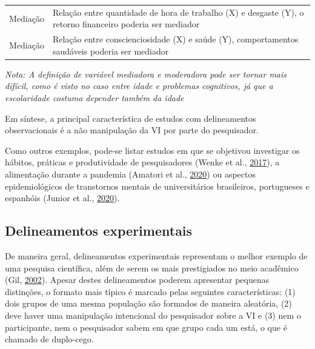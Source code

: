 \documentclass[
]{book}
\begin{document}
\begin{longtable}[]{@{}ll@{}}
\begin{minipage}[t]{0.10\columnwidth}\raggedright
Mediação\strut
\end{minipage} & \begin{minipage}[t]{0.84\columnwidth}\raggedright
Relação entre quantidade de hora de trabalho (X) e desgaste (Y), o
retorno financeiro poderia ser mediador\strut
\end{minipage}\tabularnewline
\begin{minipage}[t]{0.10\columnwidth}\raggedright
Mediação\strut
\end{minipage} & \begin{minipage}[t]{0.84\columnwidth}\raggedright
Relação entre conscienciosidade (X) e saúde (Y), comportamentos
saudáveis poderia ser mediador\strut
\end{minipage}\tabularnewline
\bottomrule
\end{longtable}

\emph{Nota: A definição de variável mediadora e moderadora pode ser
tornar mais difícil, como é visto no caso entre idade e problemas
cognitivos, já que a escolaridade costuma depender também da idade}

Em síntese, a principal característica de estudos com delineamentos
observacionais é a não manipulação da VI por parte do pesquisador.

Como outros exemplos, pode-se listar estudos em que se objetivou
investigar os hábitos, práticas e produtividade de pesquisadores (Wenke
et al., \protect\hyperlink{ref-Wenke2017}{2017}), a alimentação durante
a pandemia (Amatori et al., \protect\hyperlink{ref-Amatori2020}{2020})
ou aspectos epidemiológicos de transtornos mentais de universitários
brasileiros, portugueses e espanhóis (Junior et al.,
\protect\hyperlink{ref-AfonsoJunior2020}{2020}).

\hypertarget{delineamentos-experimentais}{%
\subsection{Delineamentos
experimentais}\label{delineamentos-experimentais}}

De maneira geral, delineamentos experimentais representam o melhor
exemplo de uma pesquisa científica, além de serem os mais prestigiados
no meio acadêmico (Gil, \protect\hyperlink{ref-gil2002}{2002}). Apesar
destes delineamentos poderem apresentar pequenas distinções, o formato
mais típico é marcado pelas seguintes características: (1) dois grupos
de uma mesma população são formados de maneira aleatória, (2) deve haver
uma manipulação intencional do pesquisador sobre a VI e (3) nem o
participante, nem o pesquisador sabem em que grupo cada um está, o que é
chamado de duplo-cego.
\end{document}
